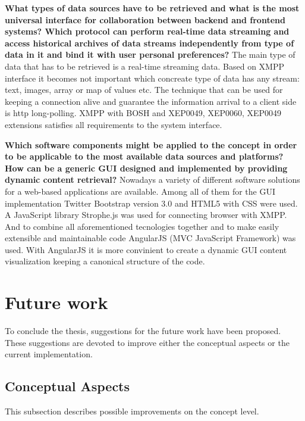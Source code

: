 \textbf{What types of data sources have to be retrieved and what is the most universal interface for collaboration between backend and frontend systems? Which protocol can perform real-time data streaming and access historical archives of data streams independently from type of data in it and bind it with user personal preferences?}
\newline
The main type of data that has to be retrieved is a real-time streaming data. Based on XMPP interface it becomes not important which concreate type of data has any stream: text, images, array or map of values etc. The technique that can be used for keeping a connection alive and guarantee the information arrival to a client side is http long-polling. 
\newline
XMPP with BOSH and XEP0049, XEP0060, XEP0049 extensions satisfies all requirements to the system interface.

\textbf{Which software components might be applied to the concept in order to be applicable to the most available data sources and platforms? How can be a generic GUI designed and implemented by providing dynamic content retrieval?} 
\newline
Nowadays a variety of different software solutions for a web-based applications are available. Among all of them for the GUI implementation Twitter Bootstrap version 3.0 and HTML5 with CSS were used. A JavaScript library Strophe.js was used for connecting browser with XMPP. And to combine all aforementioned tecnologies together and to make easily extensible and maintainable code AngularJS (MVC JavaScript Framework) was used. With AngularJS it is more convinient to create a dynamic GUI content visualization keeping a canonical structure of the code.

\section{Future work}
To conclude the thesis, suggestions for the future work have been proposed. These suggestions are devoted to improve either the conceptual aspects or the current implementation.

\subsection{Conceptual Aspects}
This subsection describes possible improvements on the concept level.
